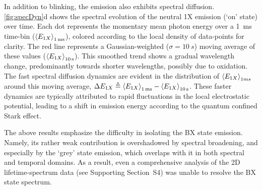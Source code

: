 \documentclass[journal=nalefd, manuscript=letter, layout=twocolumn]{achemso}
\newcommand{\supp}[1]{Supporting Section~S#1}
\begin{document}
In addition to blinking, the emission also exhibits spectral diffusion. \autoref{fig:specDyn}d shows the spectral evolution of the neutral 1X emission (`on' state) over time. Each dot represents the momentary mean photon energy over a \SI{1}{ms} time-bin ($\ev{E_{1X}}_{\SI{1}{ms}}$), colored according to the local density of data-points for clarity. The red line represents a Gaussian-weighted ($\sigma=\SI{10}{s}$) moving average of these values ($\ev{E_{1X}}_{\SI{10}{s}}$). This smoothed trend shows a gradual wavelength change, predominantly towards shorter wavelengths, possibly due to oxidation\cite{VanSark2001}. The fast spectral diffusion dynamics are evident in the distribution of $\ev{E_{1X}}_{1ms}$ around this moving average, $\Delta E_{1X}\triangleq \ev{E_{1X}}_{\SI{1}{ms}}-\ev{E_{1X}}_{\SI{10}{s}}$. These faster dynamics are typically attributed to rapid fluctuations in the local electrostatic potential, leading to a shift in emission energy according to the quantum confined Stark effect\cite{Empedocles1997}.

The above results emphasize the difficulty in isolating the BX state emission. Namely, its rather weak contribution is overshadowed by spectral broadening, and especially by the `grey' state emission, which overlaps with it in both spectral and temporal domains. As a result, even a comprehensive analysis of the 2D lifetime-spectrum data (see \supp{4}) was unable to resolve the BX state spectrum.
\end{document}
